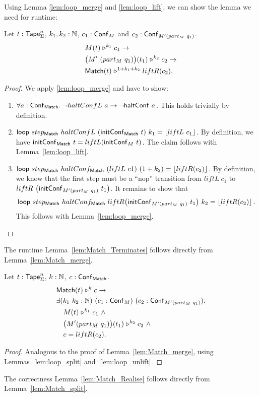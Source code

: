 Using Lemma \ref{lem:loop_merge} and \ref{lem:loop_lift}, we can show the lemma we need for runtime:
\begin{lemma}
  \label{lem:Match_merge}
  Let $t : \mathsf{Tape}_\Sigma^n$, $k_1, k_2:\mathbb{N}$, $c_1 : \mathsf{Conf}_M$ and $c_2 : \mathsf{Conf}_{M'(part_M~q_1)}$.
  \begin{alignat*}{1}
    & M(t) \mathrel{\triangleright}^{k_1} c_1 \rightarrow\\
    & \bigl( M'~(part_M~q_1) \bigr) (t_1) \mathrel{\triangleright}^{k_2} c_2 \rightarrow\\
    & \mathsf{Match}(t) \mathrel{\triangleright}^{1+k_1+k_2} liftR(c_2).
  \end{alignat*}
\end{lemma}
\begin{proof}
  We apply \ref{lem:loop_merge} and have to show:
  \begin{enumerate}
  \item $\forall a:\mathsf{Conf}_{\mathsf{Match}}.~ \lnot haltConfL~a \rightarrow \lnot \mathsf{haltConf}~a$.  This holds trivially by definition.
  \item $\mathsf{loop}~step_{\mathsf{Match}}~haltConfL~(\mathsf{initConf}_{\mathsf{Match}}~t)~k_1 =
    \left\lfloor {liftL~c_1} \right\rfloor$.  By definition, we have $\mathsf{initConf}_{\mathsf{Match}}~t=liftL(\mathsf{initConf}_M~t)$.  The claim follows with Lemma~\ref{lem:loop_lift}.
  \item $\mathsf{loop}~step_{\mathsf{Match}}~haltConf_{\mathsf{Match}}~(liftL~c1)~(1+k_2) =
    \left\lfloor {liftR(c_2)} \right\rfloor$.  By definition, we know that the first step must be a ``nop'' transition from
    $liftL~c_1$ to\\
    $liftR~\bigl(\mathsf{initConf}_{M'(part_M~q_1)}~t_1 \bigr)$.  It remains to show that
    $$\mathsf{loop}~step_{\mathsf{Match}}~haltConf_{\mathsf{Match}}~liftR \bigl(\mathsf{initConf}_{M'(part_M~q_1)}~t_1 \bigr)~k_2 = \left\lfloor {liftR(c_2)} \right\rfloor.$$
    This follows with Lemma~\ref{lem:loop_merge}.
  \end{enumerate}
\end{proof}
The runtime Lemma~\ref{lem:Match_Terminates} follows directly from Lemma~\ref{lem:Match_merge}.

\begin{lemma}
  \label{lem:Match_split}
  Let $t : \mathsf{Tape}_\Sigma^n$, $k : \mathbb{N}$, $c : \mathsf{Conf}_{\mathsf{Match}}$.
  \begin{align*}
    & \mathsf{Match}(t) \mathrel{\triangleright}^k c \rightarrow \\
    & \exists (k_1~k_2 : \mathbb{N})~(c_1 : \mathsf{Conf}_M)~(c_2 : \mathsf{Conf}_{M'(part_M~q_1)}). \\
    & \quad M(t) \mathrel{\triangleright}^{k_1} c_1 ~\land~ \\
    & \quad \bigl( M' (part_M~q_1) \bigr) (t_1) \mathrel{\triangleright}^{k_2} c_2 ~\land~ \\
    & \quad c = liftR(c_2).
  \end{align*}
\end{lemma}
\begin{proof}
  Analogous to the proof of Lemma~\ref{lem:Match_merge}, using Lemmas~\ref{lem:loop_split} and~\ref{lem:loop_unlift}.
\end{proof}
The correctness Lemma~\ref{lem:Match_Realise} follows directly from Lemma~\ref{lem:Match_split}.


